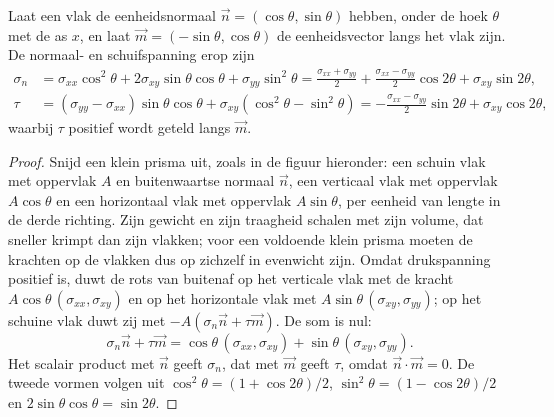 \begin{proposition}\label{prop:b1:stress-strain-rheology:transformation}
Laat een vlak de eenheidsnormaal $\vec n = (\cos\theta, \sin\theta)$ hebben, onder de hoek $\theta$ met de as $x$, en laat $\vec m = (-\sin\theta, \cos\theta)$ de eenheidsvector langs het vlak zijn. De normaal- en schuifspanning erop zijn
\begin{align*}
  \sigma_n &= \sigma_{xx}\cos^2\theta + 2\sigma_{xy}\sin\theta\cos\theta + \sigma_{yy}\sin^2\theta
           = \frac{\sigma_{xx}+\sigma_{yy}}{2} + \frac{\sigma_{xx}-\sigma_{yy}}{2}\cos2\theta + \sigma_{xy}\sin2\theta, \\
  \tau     &= (\sigma_{yy}-\sigma_{xx})\sin\theta\cos\theta + \sigma_{xy}(\cos^2\theta - \sin^2\theta)
           = -\frac{\sigma_{xx}-\sigma_{yy}}{2}\sin2\theta + \sigma_{xy}\cos2\theta ,
\end{align*}
waarbij $\tau$ positief wordt geteld langs $\vec m$.
\end{proposition}

\begin{proof}
Snijd een klein prisma uit, zoals in de figuur hieronder: een schuin vlak met oppervlak $A$ en buitenwaartse normaal $\vec n$, een verticaal vlak met oppervlak $A\cos\theta$ en een horizontaal vlak met oppervlak $A\sin\theta$, per eenheid van lengte in de derde richting. Zijn gewicht en zijn traagheid schalen met zijn volume, dat sneller krimpt dan zijn vlakken; voor een voldoende klein prisma moeten de krachten op de vlakken dus op zichzelf in evenwicht zijn. Omdat drukspanning positief is, duwt de rots van buitenaf op het verticale vlak met de kracht $A\cos\theta\,(\sigma_{xx}, \sigma_{xy})$ en op het horizontale vlak met $A\sin\theta\,(\sigma_{xy}, \sigma_{yy})$; op het schuine vlak duwt zij met $-A(\sigma_n\vec n + \tau\vec m)$. De som is nul:
\[
  \sigma_n\vec n + \tau\vec m = \cos\theta\,(\sigma_{xx}, \sigma_{xy}) + \sin\theta\,(\sigma_{xy}, \sigma_{yy}) .
\]
Het scalair product met $\vec n$ geeft $\sigma_n$, dat met $\vec m$ geeft $\tau$, omdat $\vec n\cdot\vec m = 0$. De tweede vormen volgen uit $\cos^2\theta = (1+\cos2\theta)/2$, $\sin^2\theta = (1-\cos2\theta)/2$ en $2\sin\theta\cos\theta = \sin2\theta$.
\end{proof}

